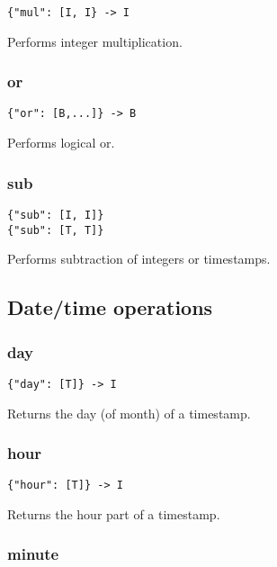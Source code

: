 \documentclass[a4paper]{article}
\begin{document}
\begin{verbatim}
{"mul": [I, I} -> I
\end{verbatim}

Performs integer multiplication.

\subsubsection{or}

\begin{verbatim}
{"or": [B,...]} -> B
\end{verbatim}

Performs logical or. 

\subsubsection{sub}

\begin{verbatim}
{"sub": [I, I]}
{"sub": [T, T]}
\end{verbatim}

Performs subtraction of integers or timestamps.

\subsection{Date/time operations}

\subsubsection{day}

\begin{verbatim}
{"day": [T]} -> I
\end{verbatim}

Returns the day (of month) of a timestamp.

\subsubsection{hour}

\begin{verbatim}
{"hour": [T]} -> I
\end{verbatim}

Returns the hour part of a timestamp.

\subsubsection{minute}
\end{document}
